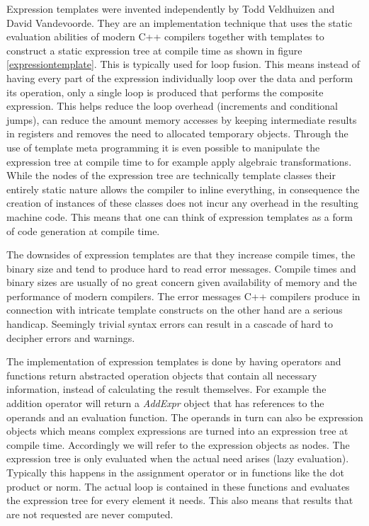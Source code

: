\documentclass[12pt]{article}
\begin{document}
Expression templates \cite{PflaumRahimi}\cite{Hardtlein1}\cite{Hardtlein2}
were invented independently by Todd Veldhuizen
\cite{Veldhuizen95} \cite{Veldhuizen98} and David Vandevoorde.
They are an implementation technique that uses the static
evaluation abilities of modern C++ compilers together with templates to
construct a static expression tree 
at compile time as shown in figure \ref{expressiontemplate}. This is typically used for
loop fusion. This means instead of having every part of the expression individually loop
over the data and perform its operation, only a single loop is produced that
performs the composite expression. This helps reduce the loop overhead
(increments and conditional jumps), can reduce the amount memory accesses by
keeping intermediate results in registers and removes the need to allocated
temporary objects. Through the use of template meta programming it is even
possible to manipulate the expression tree at compile time to for example apply algebraic
transformations. While the nodes of the expression tree are technically
template classes their entirely static nature allows the compiler to inline
everything, in consequence the creation of instances of these classes does not incur any
overhead in the resulting machine code. This means that one can think of expression templates as a form
of code generation at compile time.

The downsides of expression templates are that they increase compile times,
the binary size and tend to produce hard to read error messages. Compile times and
binary sizes are usually of no great concern given availability of memory and the
performance of modern compilers. The error messages C++ compilers produce in
connection with intricate template constructs on the other hand are a serious
handicap. Seemingly trivial syntax errors can result in a cascade of hard
to decipher errors and warnings.

The implementation of expression templates is done by having operators and
functions return abstracted operation objects that contain all necessary information,
instead of calculating the result themselves. For example the addition
operator will return a \emph{AddExpr} object that has references to the operands
and an evaluation function. The operands in turn can also be expression objects
which means complex expressions are turned into an expression tree at compile
time. Accordingly we will refer to the expression objects as nodes.
The expression tree is only evaluated when the actual need arises (lazy evaluation).
Typically this happens in the assignment operator or in functions like the
dot product or norm. The actual loop is contained in these functions and evaluates
the expression tree for every element it needs. This also means that results
that are not requested are never computed.
\end{document}
